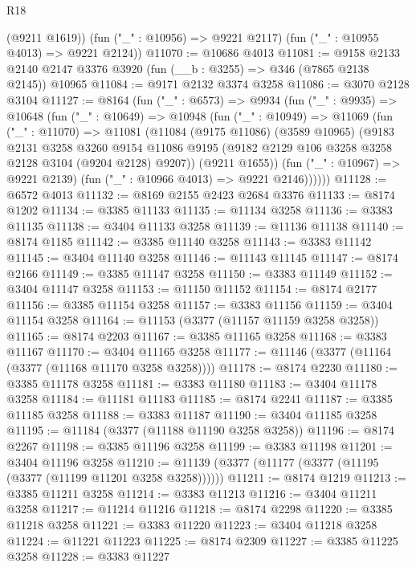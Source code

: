 \begin{lexlean}{R18}
\begin{coremodule}
        (@9211 @1619))
      (fun ("_" : @10956) => @9221 @2117)
      (fun ("_" : @10955 @4013) => @9221 @2124))
@11070 := @10686 @4013
@11081 := @9158 @2133 @2140 @2147 @3376 @3920 (fun (__b : @3255) => @346 (@7865 @2138 @2145)) @10965
@11084 := @9171 @2132 @3374 @3258
@11086 := @3070 @2128 @3104
@11127 := @8164
    (fun ("_" : @6573) =>
    @9934
      (fun ("_" : @9935) =>
      @10648
        (fun ("_" : @10649) =>
        @10948
          (fun ("_" : @10949) =>
          @11069
            (fun ("_" : @11070) =>
            @11081
              (@11084
                (@9175 @11086)
                (@3589 @10965)
                (@9183
                  @2131
                  @3258
                  @3260
                  @9154
                  @11086
                  @9195
                  (@9182 @2129 @106 @3258 @3258 @2128 @3104 (@9204 @2128) @9207))
                (@9211 @1655))
              (fun ("_" : @10967) => @9221 @2139)
              (fun ("_" : @10966 @4013) => @9221 @2146))))))
@11128 := @6572 @4013
@11132 := @8169 @2155 @2423 @2684 @3376
@11133 := @8174 @1202
@11134 := @3385 @11133
@11135 := @11134 @3258
@11136 := @3383 @11135
@11138 := @3404 @11133 @3258
@11139 := @11136 @11138
@11140 := @8174 @1185
@11142 := @3385 @11140 @3258
@11143 := @3383 @11142
@11145 := @3404 @11140 @3258
@11146 := @11143 @11145
@11147 := @8174 @2166
@11149 := @3385 @11147 @3258
@11150 := @3383 @11149
@11152 := @3404 @11147 @3258
@11153 := @11150 @11152
@11154 := @8174 @2177
@11156 := @3385 @11154 @3258
@11157 := @3383 @11156
@11159 := @3404 @11154 @3258
@11164 := @11153 (@3377 (@11157 @11159 @3258 @3258))
@11165 := @8174 @2203
@11167 := @3385 @11165 @3258
@11168 := @3383 @11167
@11170 := @3404 @11165 @3258
@11177 := @11146 (@3377 (@11164 (@3377 (@11168 @11170 @3258 @3258))))
@11178 := @8174 @2230
@11180 := @3385 @11178 @3258
@11181 := @3383 @11180
@11183 := @3404 @11178 @3258
@11184 := @11181 @11183
@11185 := @8174 @2241
@11187 := @3385 @11185 @3258
@11188 := @3383 @11187
@11190 := @3404 @11185 @3258
@11195 := @11184 (@3377 (@11188 @11190 @3258 @3258))
@11196 := @8174 @2267
@11198 := @3385 @11196 @3258
@11199 := @3383 @11198
@11201 := @3404 @11196 @3258
@11210 := @11139 (@3377 (@11177 (@3377 (@11195 (@3377 (@11199 @11201 @3258 @3258))))))
@11211 := @8174 @1219
@11213 := @3385 @11211 @3258
@11214 := @3383 @11213
@11216 := @3404 @11211 @3258
@11217 := @11214 @11216
@11218 := @8174 @2298
@11220 := @3385 @11218 @3258
@11221 := @3383 @11220
@11223 := @3404 @11218 @3258
@11224 := @11221 @11223
@11225 := @8174 @2309
@11227 := @3385 @11225 @3258
@11228 := @3383 @11227

\end{coremodule}
\end{lexlean}
